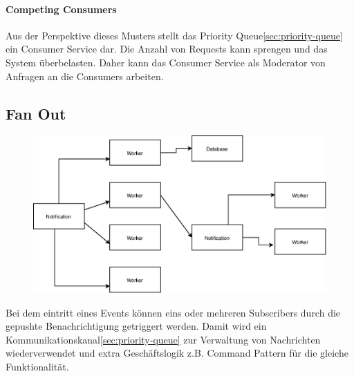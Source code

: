 \documentclass[
12pt,
english,
ngerman,
headsepline,
twoside,
openright,
numbers=noenddot,version=first
]{scrreprt}
\begin{document}
\paragraph{Competing Consumers}
Aus der Perspektive dieses Musters stellt das Priority Queue\ref{sec:priority-queue} ein Consumer Service dar. Die Anzahl von Requests kann sprengen und das System überbelasten. Daher kann das Consumer Service als Moderator von Anfragen an die Consumers arbeiten. 



\subsection{Fan Out\cite{serverlessArchAWS}}
\label{sec:fan-out}
\begin{figure}
	\includegraphics[scale=0.36]{./pics/pattern-fan-out.eps}
\end{figure}
Bei dem eintritt eines Events können eins oder mehreren Subscribers durch die gepushte Benachrichtigung getriggert werden. Damit wird ein Kommunikationskanal\ref{sec:priority-queue} zur Verwaltung von Nachrichten wiederverwendet und extra Geschäftslogik z.B. Command Pattern für die gleiche Funktionalität.
\end{document}
